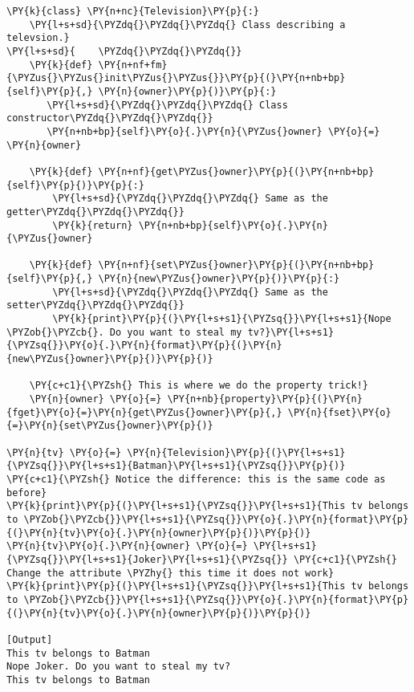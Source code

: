 \begin{Verbatim}[label=\makebox{\url{https://github.com/lucabaldini/cmepda/tree/master/slides/latex/snippets/class\_tv\_encapsulation\_properties\_verbose.py}},commandchars=\\\{\}]
\PY{k}{class} \PY{n+nc}{Television}\PY{p}{:}
    \PY{l+s+sd}{\PYZdq{}\PYZdq{}\PYZdq{} Class describing a televsion.}
\PY{l+s+sd}{    \PYZdq{}\PYZdq{}\PYZdq{}}
    \PY{k}{def} \PY{n+nf+fm}{\PYZus{}\PYZus{}init\PYZus{}\PYZus{}}\PY{p}{(}\PY{n+nb+bp}{self}\PY{p}{,} \PY{n}{owner}\PY{p}{)}\PY{p}{:}
       \PY{l+s+sd}{\PYZdq{}\PYZdq{}\PYZdq{} Class constructor\PYZdq{}\PYZdq{}\PYZdq{}}
       \PY{n+nb+bp}{self}\PY{o}{.}\PY{n}{\PYZus{}owner} \PY{o}{=} \PY{n}{owner}
    
    \PY{k}{def} \PY{n+nf}{get\PYZus{}owner}\PY{p}{(}\PY{n+nb+bp}{self}\PY{p}{)}\PY{p}{:}
        \PY{l+s+sd}{\PYZdq{}\PYZdq{}\PYZdq{} Same as the getter\PYZdq{}\PYZdq{}\PYZdq{}}
        \PY{k}{return} \PY{n+nb+bp}{self}\PY{o}{.}\PY{n}{\PYZus{}owner}
        
    \PY{k}{def} \PY{n+nf}{set\PYZus{}owner}\PY{p}{(}\PY{n+nb+bp}{self}\PY{p}{,} \PY{n}{new\PYZus{}owner}\PY{p}{)}\PY{p}{:}
        \PY{l+s+sd}{\PYZdq{}\PYZdq{}\PYZdq{} Same as the setter\PYZdq{}\PYZdq{}\PYZdq{}}
        \PY{k}{print}\PY{p}{(}\PY{l+s+s1}{\PYZsq{}}\PY{l+s+s1}{Nope \PYZob{}\PYZcb{}. Do you want to steal my tv?}\PY{l+s+s1}{\PYZsq{}}\PY{o}{.}\PY{n}{format}\PY{p}{(}\PY{n}{new\PYZus{}owner}\PY{p}{)}\PY{p}{)}
    
    \PY{c+c1}{\PYZsh{} This is where we do the property trick!}
    \PY{n}{owner} \PY{o}{=} \PY{n+nb}{property}\PY{p}{(}\PY{n}{fget}\PY{o}{=}\PY{n}{get\PYZus{}owner}\PY{p}{,} \PY{n}{fset}\PY{o}{=}\PY{n}{set\PYZus{}owner}\PY{p}{)}
 
\PY{n}{tv} \PY{o}{=} \PY{n}{Television}\PY{p}{(}\PY{l+s+s1}{\PYZsq{}}\PY{l+s+s1}{Batman}\PY{l+s+s1}{\PYZsq{}}\PY{p}{)}
\PY{c+c1}{\PYZsh{} Notice the difference: this is the same code as before}
\PY{k}{print}\PY{p}{(}\PY{l+s+s1}{\PYZsq{}}\PY{l+s+s1}{This tv belongs to \PYZob{}\PYZcb{}}\PY{l+s+s1}{\PYZsq{}}\PY{o}{.}\PY{n}{format}\PY{p}{(}\PY{n}{tv}\PY{o}{.}\PY{n}{owner}\PY{p}{)}\PY{p}{)} 
\PY{n}{tv}\PY{o}{.}\PY{n}{owner} \PY{o}{=} \PY{l+s+s1}{\PYZsq{}}\PY{l+s+s1}{Joker}\PY{l+s+s1}{\PYZsq{}} \PY{c+c1}{\PYZsh{} Change the attribute \PYZhy{} this time it does not work}
\PY{k}{print}\PY{p}{(}\PY{l+s+s1}{\PYZsq{}}\PY{l+s+s1}{This tv belongs to \PYZob{}\PYZcb{}}\PY{l+s+s1}{\PYZsq{}}\PY{o}{.}\PY{n}{format}\PY{p}{(}\PY{n}{tv}\PY{o}{.}\PY{n}{owner}\PY{p}{)}\PY{p}{)}

[Output]
This tv belongs to Batman
Nope Joker. Do you want to steal my tv?
This tv belongs to Batman
\end{Verbatim}